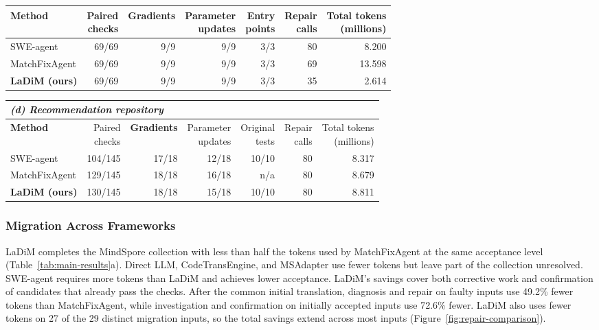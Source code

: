 \documentclass{article}
\newcommand{\thead}[1]{\textbf{\shortstack[b]{#1}}}
\begin{document}
\begin{table}[t]
\begin{tabular*}{\linewidth}{@{\extracolsep{\fill}}lrrrrrr@{}}
\midrule
\textbf{Method} & \thead{Paired\\checks} & \textbf{Gradients} & \thead{Parameter\\updates} & \thead{Entry\\points} & \thead{Repair\\calls} & \thead{Total tokens\\(millions)} \\
\midrule
SWE-agent & 69/69 & 9/9 & 9/9 & 3/3 & 80 & 8.200 \\
MatchFixAgent & 69/69 & 9/9 & 9/9 & 3/3 & 69 & 13.598 \\
\textbf{LaDiM (ours)} & 69/69 & 9/9 & 9/9 & 3/3 & 35 & 2.614 \\
\bottomrule
\end{tabular*}
\par\vspace{5pt}
\begin{tabular*}{\linewidth}{@{\extracolsep{\fill}}lrrrrrr@{}}
\toprule
\multicolumn{7}{l}{\textit{(d) Recommendation repository}} \\
\midrule
\textbf{Method} & \thead{Paired\\checks} & \textbf{Gradients} & \thead{Parameter\\updates} & \thead{Original\\tests} & \thead{Repair\\calls} & \thead{Total tokens\\(millions)} \\
\midrule
SWE-agent & 104/145 & 17/18 & 12/18 & 10/10 & 80 & 8.317 \\
MatchFixAgent & 129/145 & 18/18 & 16/18 & n/a & 80 & 8.679 \\
\textbf{LaDiM (ours)} & 130/145 & 18/18 & 15/18 & 10/10 & 80 & 8.811 \\
\bottomrule
\end{tabular*}


\end{table}

\subsubsection{Migration Across Frameworks}

LaDiM completes the MindSpore collection with less than half the tokens used by MatchFixAgent at the same acceptance level (Table~\ref{tab:main-results}a). Direct LLM, CodeTransEngine, and MSAdapter use fewer tokens but leave part of the collection unresolved. SWE-agent requires more tokens than LaDiM and achieves lower acceptance. LaDiM's savings cover both corrective work and confirmation of candidates that already pass the checks. After the common initial translation, diagnosis and repair on faulty inputs use 49.2\% fewer tokens than MatchFixAgent, while investigation and confirmation on initially accepted inputs use 72.6\% fewer. LaDiM also uses fewer tokens on 27 of the 29 distinct migration inputs, so the total savings extend across most inputs (Figure~\ref{fig:repair-comparison}).
\end{document}

